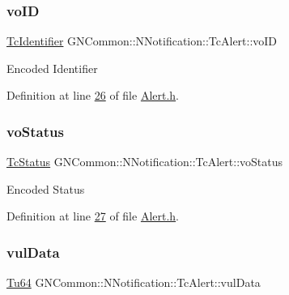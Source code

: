 \subsubsection{\texorpdfstring{vo\+ID}{voID}}
{\footnotesize\ttfamily \mbox{\hyperlink{class_g_n_common_1_1_n_notification_1_1_tc_identifier}{Tc\+Identifier}} G\+N\+Common\+::\+N\+Notification\+::\+Tc\+Alert\+::vo\+ID\hspace{0.3cm}{\ttfamily [protected]}}

Encoded Identifier 

Definition at line \mbox{\hyperlink{_alert_8h_source_l00026}{26}} of file \mbox{\hyperlink{_alert_8h_source}{Alert.\+h}}.

\mbox{\label{class_g_n_common_1_1_n_notification_1_1_tc_alert_ae993e1ea34de5347b08b21c9264cdb8e}} 
\subsubsection{\texorpdfstring{vo\+Status}{voStatus}}
{\footnotesize\ttfamily \mbox{\hyperlink{class_g_n_common_1_1_n_notification_1_1_tc_status}{Tc\+Status}} G\+N\+Common\+::\+N\+Notification\+::\+Tc\+Alert\+::vo\+Status\hspace{0.3cm}{\ttfamily [protected]}}

Encoded Status 

Definition at line \mbox{\hyperlink{_alert_8h_source_l00027}{27}} of file \mbox{\hyperlink{_alert_8h_source}{Alert.\+h}}.

\mbox{\label{class_g_n_common_1_1_n_notification_1_1_tc_alert_ab49cb616a0e61e74234264d775a3408a}} 
\subsubsection{\texorpdfstring{vul\+Data}{vulData}}
{\footnotesize\ttfamily \mbox{\hyperlink{namespace_g_n_common_a9404ee6090c788ae70aebd1436ceb97d}{Tu64}} G\+N\+Common\+::\+N\+Notification\+::\+Tc\+Alert\+::vul\+Data\hspace{0.3cm}{\ttfamily [protected]}}

